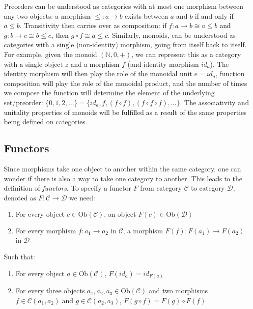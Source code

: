 \documentclass[12pt,a4paper]{article}
\begin{document}
Preorders can be understood as categories with at most one morphism between any two objects: a morphism $\leq : a \to b$ exists between $a$ and $b$ if and only if $a \leq b$. Transitivity then carries over as composition: if $f: a \to b \cong a \leq b$ and $g: b \to c \cong b \leq c$, then $g \circ f \cong a \leq c$. Similarly, monoids, can be understood as categories with a single (non-identity) morphism, going from itself back to itself. For example, given the monoid $(\mathbb{N}, 0, +)$, we can represent this as a category with a single object $z$ and a morphism $f$ (and identity morphism $id_a$). The identity morphism will then play the role of the monoidal unit $e = id_a$, function composition will play the role of the monoidal product, and the number of times we compose the function will determine the element of the underlying set/preorder: $\{0, 1, 2, \ldots \} = \{id_a, f, (f \circ f), (f \circ f \circ f), \ldots \}$. The associativity and unitality properties of monoids will be fulfilled as a result of the same properties being defined on categories.  

\subsection{Functors}

Since morphisms take one object to another within the same category, one can wonder if there is also a way to take one category to another. This leads to the definition of \textit{functors}. To specify a functor $F$ from category $\mathcal{C}$ to category $\mathcal{D}$, denoted as $F: \mathcal{C} \to \mathcal{D}$ we need:

\begin{enumerate}
\item For every object $c \in \text{Ob}(\mathcal{C})$, an object $F(c) \in \text{Ob}(\mathcal{D})$
\item For every morphism $f: a_1 \to a_2$ in $\mathcal{C}$, a morphism $F(f): F(a_1) \to F(a_2)$ in $\mathcal{D}$ 
\end{enumerate}

Such that:

\begin{enumerate}
\renewcommand{\theenumi}{\alph{enumi}}
\item For every object $a \in \text{Ob}(\mathcal{C})$, $F(id_a) = id_{F(a)}$
\item For every three objects $a_1, a_2, a_3 \in \text{Ob}(\mathcal{C})$ and two morphisms $f \in \mathcal{C}(a_1, a_2)$ and $g \in \mathcal{C}(a_2, a_3)$, $F(g \circ f) = F(g) \circ F(f)$
\end{enumerate}
\end{document}
